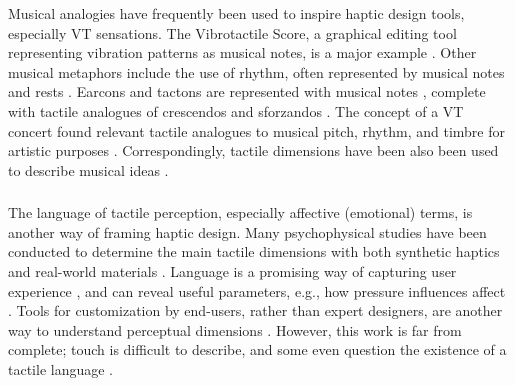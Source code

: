 Musical analogies have frequently been used to inspire haptic design tools, especially VT sensations. %
The Vibrotactile Score, a graphical editing tool representing vibration patterns as musical notes, is a major example \cite{Lee2012, Lee2009}.
Other musical metaphors include the use of rhythm, often represented by musical notes and rests \cite{Ternes2008,Brown2005,Chan2008, Brown2006a}.
Earcons and tactons are represented with musical notes \cite{Brewster1993,Brewster2004}, complete with
tactile analogues of crescendos and sforzandos \cite{Brown2006}.
The concept of a VT concert found relevant tactile analogues to musical pitch, rhythm, and timbre for artistic purposes \cite{Gunther2002}.
Correspondingly, tactile dimensions have been also been used to describe musical ideas \cite{Eitan2010}.


\subsubsection{}
The language of tactile perception, especially affective (emotional) terms, is another way of framing haptic design.
Many psychophysical studies have been conducted to determine the main tactile dimensions with both synthetic haptics and real-world materials  \cite{Enriquez2003,Okamoto2013}.
Language is a promising way of capturing user experience \cite{Obrist2013}, and can reveal useful parameters, e.g., how pressure influences affect \cite{Zheng2012}.
Tools for customization by end-users, rather than expert designers, are another way to understand perceptual dimensions \cite{Seifi2014, Seifi2015}.
However, this work is far from complete; touch is difficult to describe, and some even question the existence of a tactile language \cite{Jansson-Boyd2011}.





